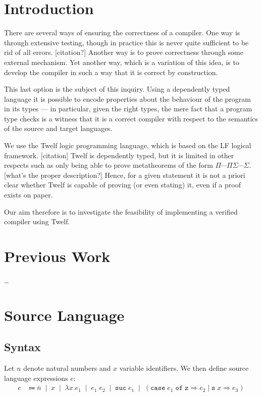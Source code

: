 \documentclass[12pt]{article}
\newcommand{\alt}{\;\; | \;\;}
\newcommand{\defi}{\Coloneqq}
\newcommand{\set}[1]{\{#1\}}
\newcommand{\z}{\mathtt{z}}
\newcommand{\suc}{\mathtt{s} \;}
\newcommand{\n}[1]{\overline{#1}}
\newcommand{\lam}[2]{\lambda #1. #2}
\newcommand{\app}{\;}
\newcommand{\hsuc}[1]{\mathtt{suc} \; #1}
\newcommand{\hcase}[3]{\mathtt{case} \; #1 \; \mathtt{of} \; \z \Rightarrow #2 \; | \; \suc{x} \Rightarrow #3}
\newcommand{\e}{e} %
\renewcommand{\c}{c} %
\begin{document}
\section*{Introduction}

There are several ways of ensuring the correctness of a compiler.
One way is through extensive testing, though in practice this is never quite sufficient to be rid of all errors. [citation?]
Another way is to prove correctness through some external mechanism.
Yet another way, which is a variation of this idea, is to develop the compiler in such a way that it is correct by construction.

This last option is the subject of this inquiry.
Using a dependently typed language it is possible to encode properties about the behaviour of the program in its types --- in particular, given the right types, the mere fact that a program type checks is a witness that it is a correct compiler with respect to the semantics of the source and target languages.

We use the Twelf logic programming language, which is based on the LF logical framework. [citation]
Twelf is dependently typed, but it is limited in other respects such as only being able to prove metatheorems of the form $\Pi \cdots \Pi \Sigma \cdots \Sigma$. [what's the proper description?]
Hence, for a given statement it is not a priori clear whether Twelf is capable of proving (or even stating) it, even if a proof exists on paper.

Our aim therefore is to investigate the feasibility of implementing a verified compiler using Twelf.

\section*{Previous Work}

\ldots

\section*{Source Language}            

\subsection*{Syntax}

Let $n$ denote natural numbers and $x$ variable identifiers. We then define source language expressions $\e$:
\begin{align*}
  \e &\defi \n{n} \alt x \alt \lam{x}{\e_1} \alt \e_1 \app \e_2 \alt \hsuc{\e_1} \alt (\hcase{\e_1}{\e_2}{\e_3})
\end{align*}
\end{document}
